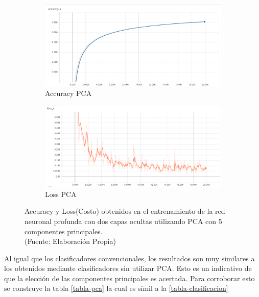 \begin{figure}[ht!]
\centering
\begin{subfigure}{.5\textwidth}
  \centering
  \includegraphics[width=1.0\linewidth]{figures/nn_plot_pca.png}
  \caption{Accuracy PCA}
  \label{fig:sub1}
\end{subfigure}%
\begin{subfigure}{.5\textwidth}
  \centering
  \includegraphics[width=1.0\linewidth]{figures/nn_loss_pca.png}
  \caption{Loss PCA}
  \label{fig:sub2}
\end{subfigure}
\caption[Accuracy y Loss(Costo) obtenidos en el entrenamiento de la red neuronal profunda con dos capas ocultas utilizando PCA]{Accuracy y Loss(Costo) obtenidos en el entrenamiento de la red neuronal profunda con dos capas ocultas utilizando PCA con 5 componentes principales. \\
{\scriptsize (Fuente: Elaboración Propia)}}
\label{fig:nn_metrics_pca}
\end{figure}

Al igual que los clasificadores convencionales, los resultados son muy similares a los obtenidos mediante clasificadores sin utilizar PCA. Esto es un indicativo de que la elección de las componentes principales es acertada. Para corroborar esto se construye la tabla \autoref{tabla-pca} la cual es símil a la \autoref{tabla-clasificacion}

